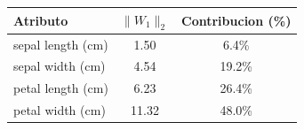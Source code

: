 \begin{tabular}{@{}lcc@{}}
\toprule
Atributo & $\|W_1\|_2$ & Contribucion (\%) \\
\midrule
sepal length (cm) & 1.50 & 6.4\% \\
sepal width (cm) & 4.54 & 19.2\% \\
petal length (cm) & 6.23 & 26.4\% \\
petal width (cm) & 11.32 & 48.0\% \\
\bottomrule
\end{tabular}
